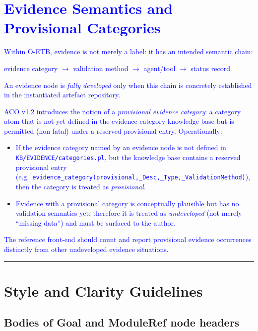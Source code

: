 \documentclass[11pt,twoside,a4paper]{article}
\begin{document}
\section{\textcolor{blue}{Evidence Semantics and Provisional Categories}}

\textcolor{blue}{Within O-ETB, evidence is not merely a label: it has an intended semantic chain:}

\begin{center}
\textcolor{blue}{evidence category $\rightarrow$ validation method $\rightarrow$ agent/tool $\rightarrow$ status record}
\end{center}

\textcolor{blue}{An evidence node is \emph{fully developed} only when this chain is concretely established in the instantiated artefact repository.}

\textcolor{blue}{ACO v1.2 introduces the notion of a \emph{provisional evidence category}: a category atom that is not yet defined in the evidence-category knowledge base but is permitted (non-fatal) under a reserved provisional entry. Operationally:}
\begin{itemize}[leftmargin=2em]
  \item \textcolor{blue}{If the evidence category named by an evidence node is not defined in \texttt{KB/\allowbreak EVIDENCE/\allowbreak categories.pl}, but the knowledge base contains a reserved provisional entry (e.g.\ \texttt{evidence\_category(provisional,\_Desc,\allowbreak\_Type,\allowbreak\_ValidationMethod)}), then the category is treated as \emph{provisional}.}
  \item \textcolor{blue}{Evidence with a provisional category is conceptually plausible but has no validation semantics yet; therefore it is treated as \emph{undeveloped} (not merely ``missing data'') and must be surfaced to the author.}
\end{itemize}

\textcolor{blue}{The reference front-end should count and report provisional evidence occurrences distinctly from other undeveloped evidence situations.}



\bigskip
\hrule
\bigskip

\section{Style and Clarity Guidelines}

\subsection{Bodies of Goal and ModuleRef node headers}
\end{document}
